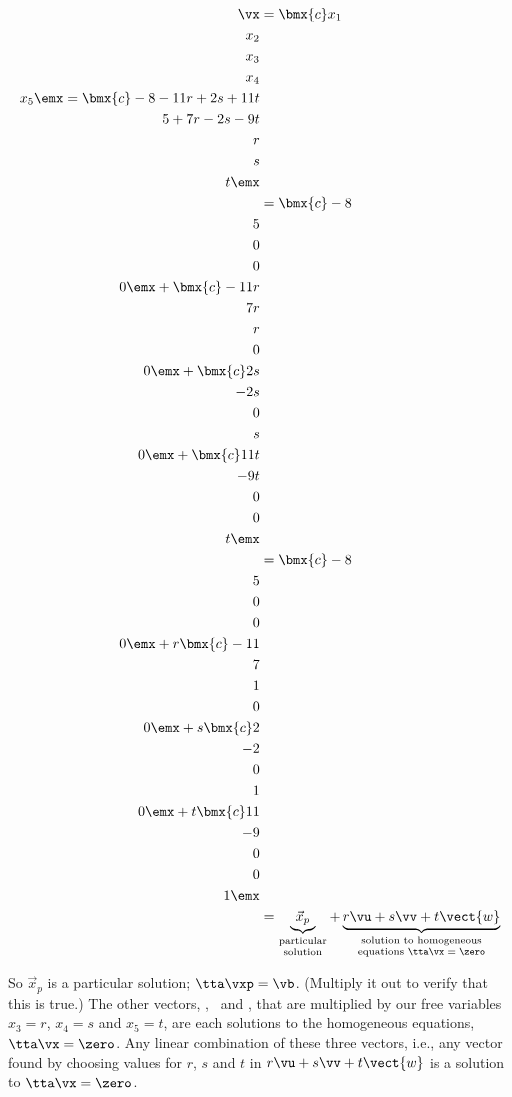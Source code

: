 {\begin{align*}
\vx &= \bmx{c}x_1\\x_2\\x_3\\x_4\\x_5\emx = \bmx{c}-8-11r+2s+11t\\5+7r-2s-9t\\r\\s\\t\emx\\
    &= \bmx{c}-8\\5\\0\\0\\0\emx + \bmx{c}-11r\\7r\\r\\0\\0\emx+ \bmx{c}2s\\-2s\\0\\s\\0\emx + \bmx{c}11t\\-9t\\0\\0\\t\emx \\
    &= \bmx{c}-8\\5\\0\\0\\0\emx + r\bmx{c}-11\\7\\1\\0\\0\emx+ s\bmx{c}2\\-2\\0\\1\\0\emx + t\bmx{c}11\\-9\\0\\0\\1\emx \\
    &= \underbrace{\vec{x}_p}_{\parbox{35pt}{\center \scriptsize {\vskip -10pt} particular solution}}+ \underbrace{r\vu+s\vv+t\vect{w}}_{\parbox{100pt}{\center \scriptsize {\vskip -10pt} solution to homogeneous equations $\tta\vx=\zero$}}
\end{align*}


So $\vec{x}_p$ is a particular solution; $\tta\vxp = \vb$. (Multiply it out to verify that this is true.) The other vectors, \vu, \vv\ and , that are multiplied by our free variables $x_3=r$, $x_4=s$ and $x_5=t$, are each solutions to the homogeneous equations, $\tta\vx=\zero$. Any linear combination of these three vectors, i.e., any vector found by choosing values for $r$, $s$ and $t$ in $r\vu+s\vv+t\vect{w}$ is a solution to $\tta\vx=\zero$.
}

